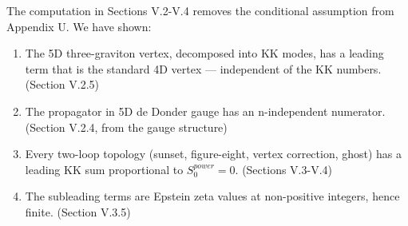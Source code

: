\documentclass[aps,prd,preprint,superscriptaddress,longbibliography,floatfix]{revtex4-2}
\theoremstyle{remark}
\begin{document}
The computation in Sections V.2-V.4 removes the conditional assumption from Appendix U. We have shown:


\begin{enumerate}
  \item The 5D three-graviton vertex, decomposed into KK modes, has a leading term that is the standard 4D vertex --- independent of the KK numbers. (Section V.2.5)
  \item The propagator in 5D de Donder gauge has an n-independent numerator. (Section V.2.4, from the gauge structure)
  \item Every two-loop topology (sunset, figure-eight, vertex correction, ghost) has a leading KK sum proportional to $S_{0}^{power} = 0$. (Sections V.3-V.4)
  \item The subleading terms are Epstein zeta values at non-positive integers, hence finite. (Section V.3.5)
\end{enumerate}
\end{document}
